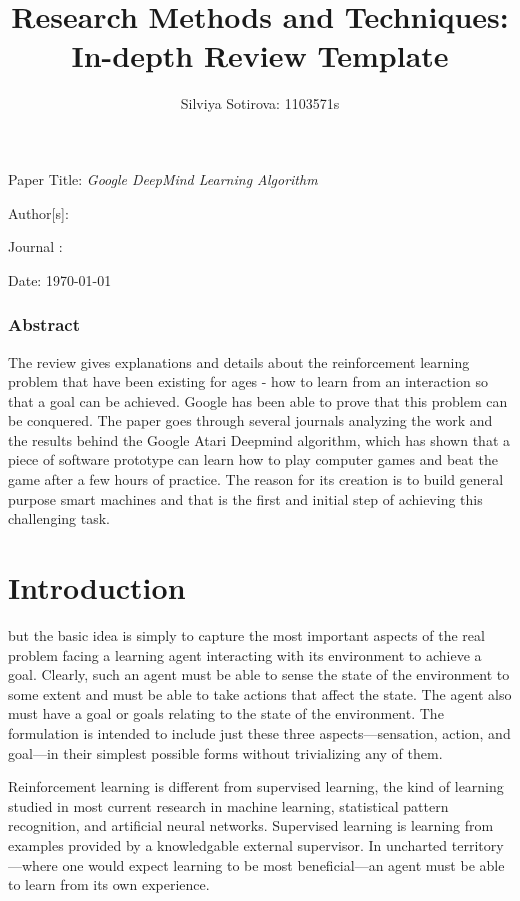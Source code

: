 \documentclass{article}
\title{{\Large{}\textbf{Research  Methods and Techniques: In-depth Review Template}}}
\author{Silviya Sotirova: 1103571s}
\begin{document}
\maketitle
 
 
Paper Title: {\em Google DeepMind Learning Algorithm} 
 
  
Author[s]: {\em }

Journal :

Date: \today{}
 
\subsubsection*{{\large{}\textbf{Abstract}}}

The review gives explanations and details about the reinforcement learning problem that have been existing for ages - how to learn from an interaction so that a goal can be achieved. Google has been able to prove that this problem can be conquered. The paper goes through several journals analyzing the work and the results behind the Google Atari Deepmind algorithm, which has shown that a piece of software prototype can learn how to play computer games and beat the game after a few hours of practice. The reason for its creation is to build general purpose smart machines and that is the first and initial step of achieving this challenging task.  


\vspace{12pt}
\section{{\textbf{Introduction}}}

but the basic
idea is simply to capture the most important aspects of the real problem facing
a learning agent interacting with its environment to achieve a goal. Clearly,
such an agent must be able to sense the state of the environment to some extent
and must be able to take actions that affect the state. The agent also must
have a goal or goals relating to the state of the environment. The formulation
is intended to include just these three aspects—sensation, action, and goal—in
their simplest possible forms without trivializing any of them.\cite{sutton1998reinforcement}

Reinforcement learning is different from supervised learning, the kind of
learning studied in most current research in machine learning, statistical pattern
recognition, and artificial neural networks. Supervised learning is learning
from examples provided by a knowledgable external supervisor. In uncharted territory—where one would expect learning to be most beneficial—an agent must be able to learn from its
own experience. \cite{sutton1998reinforcement}
\end{document}
